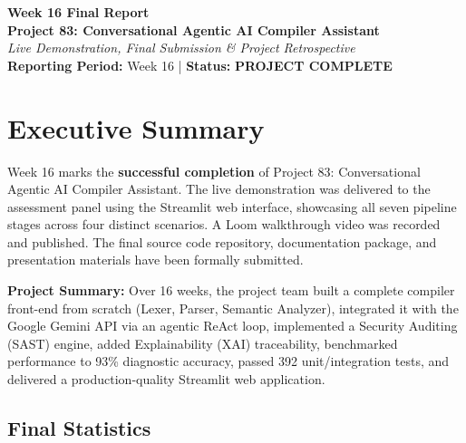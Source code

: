 \documentclass[a4paper,11pt]{article}
\newcommand{\statusgood}[1]{\colorbox{green!20}{\textbf{#1}}}
\begin{document}
\begin{center}
    {\huge \textbf{Week 16 Final Report}} \\
    \vspace{3mm}
    {\large \textbf{Project 83: Conversational Agentic AI Compiler Assistant}} \\
    \vspace{2mm}
    \textit{Live Demonstration, Final Submission \& Project Retrospective} \\
    \vspace{2mm}
    \textbf{Reporting Period:} Week 16 | \textbf{Status:} \statusgood{PROJECT COMPLETE}
\end{center}

\vspace{5mm}

\section{Executive Summary}

Week 16 marks the \textbf{successful completion} of Project 83: Conversational Agentic AI Compiler Assistant. The live demonstration was delivered to the assessment panel using the Streamlit web interface, showcasing all seven pipeline stages across four distinct scenarios. A Loom walkthrough video was recorded and published. The final source code repository, documentation package, and presentation materials have been formally submitted.

\textbf{Project Summary:} Over 16 weeks, the project team built a complete compiler front-end from scratch (Lexer, Parser, Semantic Analyzer), integrated it with the Google Gemini API via an agentic ReAct loop, implemented a Security Auditing (SAST) engine, added Explainability (XAI) traceability, benchmarked performance to 93\% diagnostic accuracy, passed 392 unit/integration tests, and delivered a production-quality Streamlit web application.

\subsection{Final Statistics}
\end{document}
